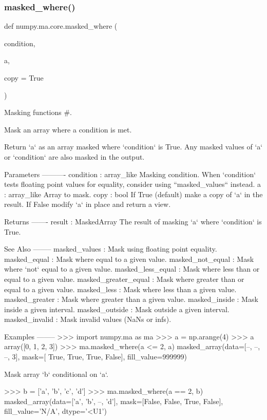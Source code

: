 \subsubsection{\texorpdfstring{masked\+\_\+where()}{masked\_where()}}
{\footnotesize\ttfamily def numpy.\+ma.\+core.\+masked\+\_\+where (\begin{DoxyParamCaption}\item[{}]{condition,  }\item[{}]{a,  }\item[{}]{copy = {\ttfamily True} }\end{DoxyParamCaption})}



Masking functions \#. 

\begin{DoxyVerb}Mask an array where a condition is met.

Return `a` as an array masked where `condition` is True.
Any masked values of `a` or `condition` are also masked in the output.

Parameters
----------
condition : array_like
    Masking condition.  When `condition` tests floating point values for
    equality, consider using ``masked_values`` instead.
a : array_like
    Array to mask.
copy : bool
    If True (default) make a copy of `a` in the result.  If False modify
    `a` in place and return a view.

Returns
-------
result : MaskedArray
    The result of masking `a` where `condition` is True.

See Also
--------
masked_values : Mask using floating point equality.
masked_equal : Mask where equal to a given value.
masked_not_equal : Mask where `not` equal to a given value.
masked_less_equal : Mask where less than or equal to a given value.
masked_greater_equal : Mask where greater than or equal to a given value.
masked_less : Mask where less than a given value.
masked_greater : Mask where greater than a given value.
masked_inside : Mask inside a given interval.
masked_outside : Mask outside a given interval.
masked_invalid : Mask invalid values (NaNs or infs).

Examples
--------
>>> import numpy.ma as ma
>>> a = np.arange(4)
>>> a
array([0, 1, 2, 3])
>>> ma.masked_where(a <= 2, a)
masked_array(data=[--, --, --, 3],
             mask=[ True,  True,  True, False],
       fill_value=999999)

Mask array `b` conditional on `a`.

>>> b = ['a', 'b', 'c', 'd']
>>> ma.masked_where(a == 2, b)
masked_array(data=['a', 'b', --, 'd'],
             mask=[False, False,  True, False],
       fill_value='N/A',
            dtype='<U1')


\end{DoxyVerb}
